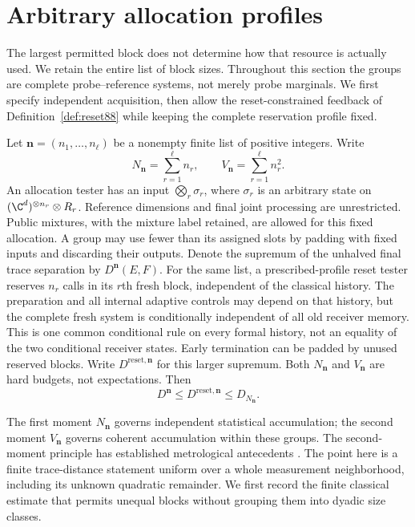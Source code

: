 \section{Arbitrary allocation profiles}
\label{sec:allocation89}
The largest permitted block does not determine how that resource is
actually used.  We retain the entire list of block sizes.  Throughout
this section the groups are complete probe--reference systems, not
merely probe marginals.  We first specify independent acquisition,
then allow the reset-constrained feedback of Definition~\ref{def:reset88}
while keeping the complete reservation profile fixed.

\begin{definition}\label{def:allocation89}
Let $\boldsymbol n=(n_1,\ldots,n_\ell)$ be a nonempty finite list of
positive integers.  Write
\[
 N_{\boldsymbol n}=\sum_{r=1}^{\ell}n_r,
 \qquad V_{\boldsymbol n}=\sum_{r=1}^{\ell}n_r^2.
\]
An allocation tester has an input
$\bigotimes_r\sigma_r$, where $\sigma_r$ is an arbitrary state on
$(\C^d)^{\otimes n_r}\otimes R_r$.  Reference dimensions and final
joint processing are unrestricted.  Public mixtures, with the
mixture label retained, are allowed for this fixed allocation.
A group may use fewer than its assigned slots by padding with fixed
inputs and discarding their outputs.  Denote the supremum of the
unhalved final trace separation by $D^{\boldsymbol n}(E,F)$.
For the same list, a prescribed-profile reset tester reserves $n_r$
calls in its $r$th fresh block, independent of the classical history.
The preparation and all internal adaptive controls may depend on that
history, but the complete fresh system is conditionally independent
of all old receiver memory.  This is one common conditional rule on
every formal history, not an equality of the two conditional receiver
states.  Early termination can be padded by unused reserved blocks.
Write $D^{\mathrm{reset},\boldsymbol n}$ for this larger supremum.
Both $N_{\boldsymbol n}$ and $V_{\boldsymbol n}$ are hard budgets,
not expectations.  Then
\[
 D^{\boldsymbol n}\le D^{\mathrm{reset},\boldsymbol n}\le D_{N_{\boldsymbol n}}.
\]
\end{definition}

The first moment $N_{\boldsymbol n}$ governs independent statistical
accumulation; the second moment $V_{\boldsymbol n}$ governs coherent
accumulation within these groups.  The second-moment principle has
established metrological antecedents \cite{Hyllus78,Toth78}.  The point
here is a finite trace-distance statement uniform over a whole
measurement neighborhood, including its unknown quadratic remainder.
We first record the finite classical estimate that permits unequal
blocks without grouping them into dyadic size classes.

